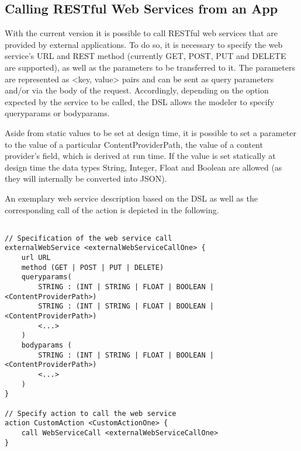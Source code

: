 
\subsection{Calling RESTful Web Services from an App}
\label{subsec: CallingWebServices}
With the current \MD version it is possible to call RESTful web services that are provided by external applications. To do so, it is necessary to specify the web service's URL and REST method (currently GET, POST, PUT and DELETE are supported), as well as the parameters to be transferred to it. The parameters are represented as <key, value> pairs and can be sent as query parameters and/or via the body of the request. Accordingly, depending on the option expected by the service to be called, the DSL allows the modeler to specify queryparams or bodyparams.

Aside from static values to be set at design time, it is possible to set a parameter to the value of a particular ContentProviderPath, \ie the value of a content provider's field, which is derived at run time. If the value is set statically at design time the data types String, Integer, Float and Boolean are allowed (as they will internally be converted into JSON).

An exemplary web service description based on the DSL as well as the corresponding call of the action is depicted in the following.

\begin{lstlisting}[language=MD2, label=lst:callWSfromWF, caption=Calling a web service from within a workflow]

// Specification of the web service call
externalWebService <externalWebServiceCallOne> {
	url URL
	method (GET | POST | PUT | DELETE)
	queryparams(
		STRING : (INT | STRING | FLOAT | BOOLEAN | <ContentProviderPath>)	
		STRING : (INT | STRING | FLOAT | BOOLEAN | <ContentProviderPath>)
		<...>	
	)
	bodyparams (
		STRING : (INT | STRING | FLOAT | BOOLEAN | <ContentProviderPath>)
		<...>
	)
}

// Specify action to call the web service
action CustomAction <CustomActionOne> {
	call WebServiceCall <externalWebServiceCallOne>
}
	
\end{lstlisting}





